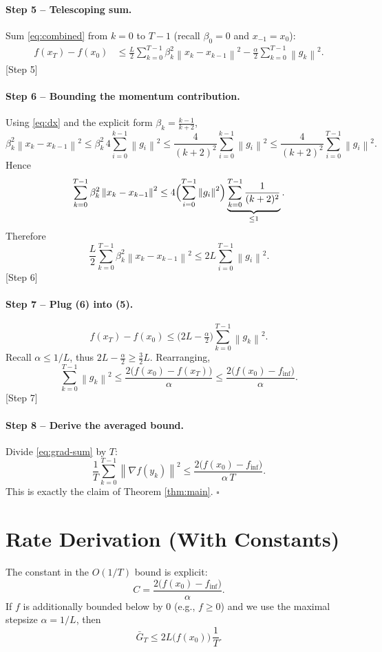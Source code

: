 \documentclass{article}
\newcommand{\norm}[1]{\left\lVert#1\right\rVert}
\newcommand{\grad}{\nabla}
\begin{document}
\paragraph{Step 5 – Telescoping sum.}  
Sum \eqref{eq:combined} from $k=0$ to $T-1$ (recall $\beta_0=0$ and $x_{-1}=x_0$):
\[
\begin{aligned}
f(x_T)-f(x_0)
&\le \frac{L}{2}\sum_{k=0}^{T-1}\beta_k^{2}\norm{x_k-x_{k-1}}^{2}
    -\frac{\alpha}{2}\sum_{k=0}^{T-1}\norm{g_k}^{2}.
\end{aligned}
\tag{5}
\label{eq:sum}
\] 
[Step 5]

\paragraph{Step 6 – Bounding the momentum contribution.}  
Using \eqref{eq:dx} and the explicit form $\beta_k=\frac{k-1}{k+2}$,
\[
\beta_k^{2}\norm{x_k-x_{k-1}}^{2}
\le \beta_k^{2}\,4\sum_{i=0}^{k-1}\norm{g_i}^{2}
\le \frac{4}{(k+2)^{2}}\sum_{i=0}^{k-1}\norm{g_i}^{2}
\le \frac{4}{(k+2)^{2}}\sum_{i=0}^{T-1}\norm{g_i}^{2}.
\]
Hence
\[
\sum_{k=0}^{T-1}\beta_k^{2}\norm{x_k-x_{k-1}}^{2}
\le 4\Bigl(\sum_{i=0}^{T-1}\norm{g_i}^{2}\Bigr)
      \underbrace{\sum_{k=0}^{T-1}\frac{1}{(k+2)^{2}}}_{\le 1}.
\]
Therefore
\[
\frac{L}{2}\sum_{k=0}^{T-1}\beta_k^{2}\norm{x_k-x_{k-1}}^{2}
\le 2L\sum_{i=0}^{T-1}\norm{g_i}^{2}.
\tag{6}
\label{eq:beta-bound}
\] 
[Step 6]

\paragraph{Step 7 – Plug (6) into (5).}  
\[
f(x_T)-f(x_0)
\le \bigl(2L-\tfrac{\alpha}{2}\bigr)\sum_{k=0}^{T-1}\norm{g_k}^{2}.
\]
Recall $\alpha\le 1/L$, thus $2L-\frac{\alpha}{2}\ge \frac{3}{2}L$.  Rearranging,
\[
\sum_{k=0}^{T-1}\norm{g_k}^{2}
\le \frac{2\bigl(f(x_0)-f(x_T)\bigr)}{\alpha}
\le \frac{2\bigl(f(x_0)-f_{\inf}\bigr)}{\alpha}.
\tag{7}
\label{eq:grad-sum}
\] 
[Step 7]

\paragraph{Step 8 – Derive the averaged bound.}  
Divide \eqref{eq:grad-sum} by $T$:
\[
\frac{1}{T}\sum_{k=0}^{T-1}\norm{\grad f(y_k)}^{2}
\le \frac{2\bigl(f(x_0)-f_{\inf}\bigr)}{\alpha\,T}.
\] 
This is exactly the claim of Theorem \ref{thm:main}. \hfill $\square$

\section*{Rate Derivation (With Constants)}
The constant in the $O(1/T)$ bound is explicit:
\[
C = \frac{2\bigl(f(x_0)-f_{\inf}\bigr)}{\alpha}.
\]
If $f$ is additionally bounded below by $0$ (e.g., $f\ge0$) and we use the maximal stepsize $\alpha=1/L$, then
\[
\bar G_T\le 2L\bigl(f(x_0)\bigr)\,\frac{1}{T}.
\]
\end{document}
